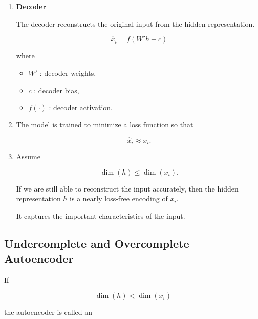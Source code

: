 \documentclass{article}
\begin{document}
\begin{enumerate}
\begin{center}
		\end{center}
		
		\item \textbf{Decoder}
		
		The decoder reconstructs the original input from the hidden representation.
		
		\[
		\boxed{\hat{x}_i=f(W'h+c)}
		\]
		
		where
		
		\begin{itemize}
			\item \(W'\) : decoder weights,
			\item \(c\) : decoder bias,
			\item \(f(\cdot)\) : decoder activation.
		\end{itemize}
		
		\item The model is trained to minimize a loss function so that
		
		\[
		\hat{x}_i\approx x_i.
		\]
		
		\item Assume
		
		\[
		\dim(h)\le \dim(x_i).
		\]
		
		If we are still able to reconstruct the input accurately, then the hidden representation \(h\) is a nearly loss-free encoding of \(x_i\).
		
		It captures the important characteristics of the input.
	\end{enumerate}
	
	\subsection{Undercomplete and Overcomplete Autoencoder}
	
	If
	
	\[
	\boxed{\dim(h)<\dim(x_i)}
	\]
	
	the autoencoder is called an
	
\end{document}
